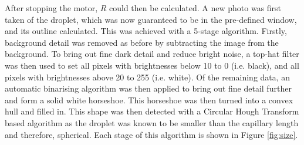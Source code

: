 \documentclass{physics_article_B}
\begin{document}
            After stopping the motor, $R$ could then be calculated. A new photo was first taken of the droplet, which was now guaranteed to be in the pre-defined window, and its outline calculated. This was achieved with a 5-stage algorithm. Firstly, background detail was removed as before by subtracting the image from the background. To bring out fine dark detail and reduce bright noise, a top-hat filter was then used to set all pixels with brightnesses below 10 to 0 (i.e. black), and all pixels with brightnesses above 20 to 255 (i.e. white). Of the remaining data, an automatic binarising algorithm was then applied to bring out fine detail further and form a solid white horseshoe. This horseshoe was then turned into a convex hull and filled in. This shape was then detected with a Circular Hough Transform based algorithm\cite{imfindcircles} as the droplet was known to be smaller than the capillary length and therefore, spherical. Each stage of this algorithm is shown in Figure \ref{fig:size}.
            \vspace{0.5cm}
\end{document}

